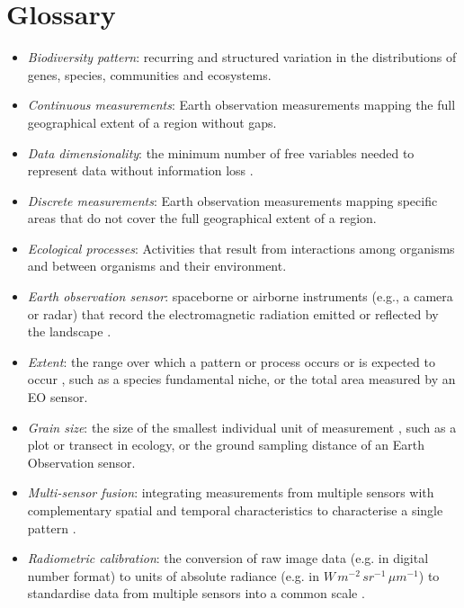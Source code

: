 \chapter{Glossary}

\begin{itemize}

\item \textit{Biodiversity pattern}: recurring and structured variation in the distributions of genes, species, communities and ecosystems.

\item \textit{Continuous measurements}: Earth observation measurements mapping the full geographical extent of a region without gaps.

\item \textit{Data dimensionality}: the minimum number of free variables needed to represent data without information loss \cite{Camastra2003-dj}.

\item \textit{Discrete measurements}: Earth observation measurements mapping specific areas that do not cover the full geographical extent of a region.

\item \textit{Ecological processes}: Activities that result from interactions among organisms and between organisms and their environment\cite{Martinez1996-vg}.

\item \textit{Earth observation sensor}: spaceborne or airborne instruments (e.g., a camera or radar) that record the electromagnetic radiation emitted or reflected by the landscape \cite{Campbell2011-sa}.

\item \textit{Extent}: the range over which a pattern or process occurs or is expected to occur \cite{Nekola1999-ks}, such as a species fundamental niche, or the total area measured by an EO sensor.

\item \textit{Grain size}: the size of the smallest individual unit of measurement \cite{Jensen1987-nd}, such as a plot or transect in ecology, or the ground sampling distance of an Earth Observation sensor.

\item \textit{Multi-sensor fusion}: integrating measurements from multiple sensors with complementary spatial and temporal characteristics to characterise a single pattern \cite{Hilker2009-aw}.

\item \textit{Radiometric calibration}: the conversion of raw image data (e.g. in digital number format) to units of absolute radiance (e.g. in $W\, m^{-2}\, sr^{-1}\, {\mu}m^{-1}$) to standardise data from multiple sensors into a common scale \cite{Chander2009-cn}.


\end{itemize}
